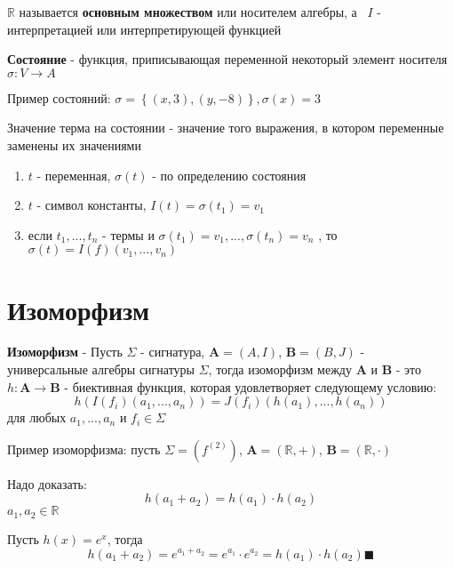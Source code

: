 \documentclass{article}
\begin{document}
\begin{dfn}
$\mathbb{R}$ называется \textbf{основным множеством} или носителем алгебры, а \
$I$ - интерпретацией или интерпретирующей функцией
\end{dfn}

\begin{dfn}
\textbf{Состояние} - функция, приписывающая переменной некоторый элемент носителя $\sigma :V\rightarrow A$
\end{dfn}

\begin{exm}
Пример состояний: $\sigma = \left\{(x,3),(y,-8)\right\}, \sigma(x)=3$
\end{exm}

\begin{dfn}
Значение терма на состоянии - значение того выражения, в котором переменные заменены их значениями

\begin{enumerate}
\item $t$ - переменная, $\sigma(t)$ - по определению состояния
\item $t$ - символ константы, $I(t)=\sigma(t_1)=v_1$
\item если $t_1,...,t_n$ - термы и $\sigma(t_1)=v_1,...,\sigma(t_n)=v_n$ , то $\sigma(t)=I(f)(v_1,...,v_n)$
\end{enumerate}
\end{dfn}

\section{Изоморфизм}
\begin{dfn}
\textbf{Изоморфизм} - Пусть $\Sigma$ - сигнатура, $\mathbf{A}=(A,I)$, $\mathbf{B}=(B,J)$ - \\
 универсальные алгебры сигнатуры $\Sigma$, тогда изоморфизм между $\mathbf{A}$ и $\mathbf{B}$ - это $h:\mathbf{A}\rightarrow \mathbf{B}$ - биективная функция, которая удовлетворяет следующему условию:
$$h(I(f_i)(a_1,...,a_n))=J(f_i)(h(a_1),...,h(a_n))$$
для любых $a_1,...,a_n$ и $f_i\in \Sigma$
\end{dfn}

\begin{exm}
Пример изоморфизма: пусть $\Sigma=(f^{(2)})$, $\mathbf{A}=(\mathbb{R},+)$, $\mathbf{B}=(\mathbb{R},\cdot)$

Надо доказать: 
$$h(a_1+a_2)=h(a_1)\cdot h(a_2)$$
$a_1,a_2\in \mathbb{R}$

Пусть $h(x)=e^x$, тогда
$$h(a_1+a_2)=e^{a_1+a_2}=e^{a_1}\cdot e^{a_2}=h(a_1)\cdot h(a_2)\blacksquare$$
\end{exm}
\end{document}
